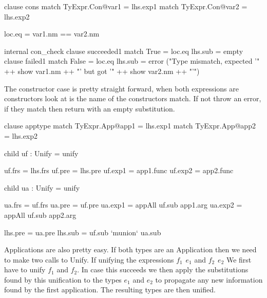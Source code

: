 \begin{code}
                     clause cons
                       match TyExpr.Con@var1 = lhs.exp1
                       match TyExpr.Con@var2 = lhs.exp2
                       
                       loc.eq = var1.nm == var2.nm
                       
                       internal con_check
                          clause succeeded1
                            match True  = loc.eq
                            lhs.sub     = empty
                          clause failed1
                            match False = loc.eq
                            lhs.sub = error ("Type mismatch, expected '" ++ show var1.nm ++ "' but got '" ++ show var2.nm ++ "'")
\end{code}
The constructor case is pretty straight forward, when both expressions are constructors look at is the name of the constructors match. If not throw an error, if they match then return with an empty substitution.

\begin{code}
                     clause apptype
                       match TyExpr.App@app1 = lhs.exp1
                       match TyExpr.App@app2 = lhs.exp2
                       
                       child uf : Unify = unify
                       
                       uf.frs  = lhs.frs
                       uf.pre  = lhs.pre
                       uf.exp1 = app1.func
                       uf.exp2 = app2.func
                       
                       child ua : Unify = unify
                       
                       ua.frs  = uf.frs
                       ua.pre  = uf.pre
                       ua.exp1 = appAll uf.sub app1.arg
                       ua.exp2 = appAll uf.sub app2.arg
                       
                       lhs.pre = ua.pre
                       lhs.sub = uf.sub `munion` ua.sub
\end{code}
Applications are also pretty easy. If both types are an Application then we need to make two calls to Unify. If unifying the expressions $f_1 \hspace{5pt} e_1$ and $f_2 \hspace{5pt} e_2$ We first have to unify $f_1$ and $f_2$. In case this succeeds we then apply the substitutions found by this unification to the types $e_1$ and $e_2$ to propagate any new information found by the first application. The resulting types are then unified. 

